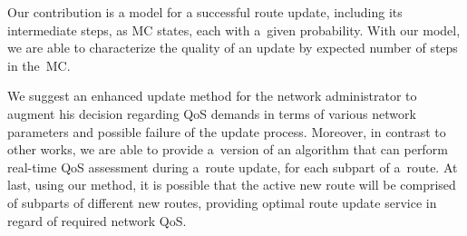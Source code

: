 \begin{multicols}{2}
Our contribution is a model for a successful route update, including its 
intermediate steps, as MC states, each with 
a~given probability. With our model, we are able to characterize the quality of 
an update by expected number of steps in the~MC. 

We suggest an enhanced update method for the network administrator to augment 
his decision regarding QoS demands in terms of various network parameters and 
possible failure of the update process. Moreover, in contrast to other works, 
we are able to provide a~version of an algorithm that can perform real-time QoS
 assessment during a~route update, for each subpart of a~route. At last, using 
 our method, it is possible that the active new route will be comprised of subparts 
 of different new routes, providing optimal route update service in regard of 
 required network QoS. 

%
%
%


\end{multicols}
